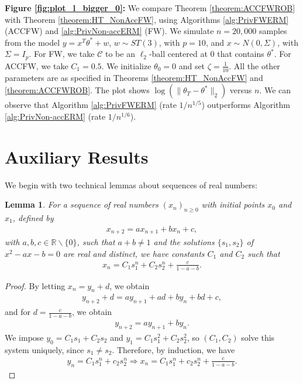 \documentclass{article}
\newtheorem{lemma}{Lemma}
\begin{document}
\textbf{Figure \ref{fig:plot_l_bigger_0}:} We compare Theorem \ref{theorem:ACCFWROB} with Theorem \ref{theorem:HT_NonAccFW}, using Algorithms \ref{alg:PrivFWERM} (ACCFW) and \ref{alg:PrivNon-accERM} (FW). We simulate $n = 20,000$ samples from the model $y = x^T\theta^* + w$, $w \sim ST(3)$, with $p = 10$, and $x \sim N(0, \Sigma)$, with $\Sigma = I_p$. For FW, we take $\mathcal{C}$ to be an $\ell_2$-ball centered at $0$ that contains $\theta^*$. For ACCFW, we take $C_1 = 0.5$. We initialize $\theta_0 = 0$ and set $\zeta = \frac{1}{10}$. All the other parameters are as specified in Theorems \ref{theorem:HT_NonAccFW} and \ref{theorem:ACCFWROB}. The plot shows $\log(\|\theta_T-\theta^*\|_2)$ versus $n$. We can observe that Algorithm \ref{alg:PrivFWERM} (rate $1/n^{1/5}$) outperforms Algorithm \ref{alg:PrivNon-accERM} (rate $1/n^{1/6}$).


\section{Auxiliary Results}
\label{Appendix A}

We begin with two technical lemmas about sequences of real numbers:
\begin{lemma}
\label{lemma:9}
For a sequence of real numbers $(x_n)_{n\geq 0}$ with initial points $x_0$ and $x_1$, defined by
\begin{align*}
x_{n + 2} = ax_{n + 1} + bx_n + c,
\end{align*}
with $a, b, c \in \mathbb{R} \backslash \{0\}$, such that $a + b \neq 1$ and the solutions $\{s_1, s_2\}$ of $x^2 - ax - b = 0$ are real and distinct, we have constants $C_1$ and $C_2$ such that
\begin{align*}
x_{n} = C_1s_1^n + C_2s_2^n + \frac{c}{1 - a - b}.
\end{align*}
\end{lemma}
\begin{proof}
By letting $x_n = y_n + d$, we obtain
\begin{align*}
y_{n + 2} + d = ay_{n + 1} + ad + by_n + bd + c,
\end{align*}
and for $d = \frac{c}{1 - a - b}$, we obtain
\begin{align*}
y_{n + 2} = ay_{n + 1} + by_n.
\end{align*}
We impose $y_0 = C_1s_1 + C_2s_2$ and $y_1 = C_1s_1^2 + C_2s_2^2$,
so $(C_1, C_2)$ solve this system uniquely, since $s_1 \neq s_2$. Therefore, by induction, we have
\begin{align*}
y_n = C_1s_1^n + c_2s_2^n \Rightarrow x_n = C_1s_1^n + c_2s_2^n + \frac{c}{1 - a - b}.
\end{align*}
\end{proof}
\end{document}
